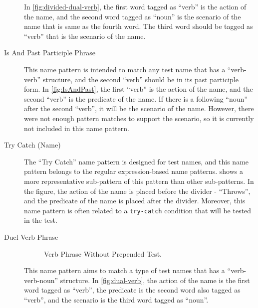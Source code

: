 \documentclass[proposal.tex]{subfiles}
\begin{document}
\begin{description}
In \cref{fig:divided-dual-verb}, the first word tagged as \enquote{verb} is the action of the name, and the second word tagged as \enquote{noun} is the scenario of the name that is same as the fourth word.
%
The third word should be tagged as \enquote{verb} that is the scenario of the name.

\item[Is And Past Participle Phrase]


This name pattern is intended to match any test name that has a \enquote{verb-verb} structure, and the second \enquote{verb} should be in its past participle form.
%
In \cref{fig:IsAndPast}, the first \enquote{verb} is the action of the name, and the second \enquote{verb} is the predicate of the name.
%
If there is a following \enquote{noun} after the second \enquote{verb}, it will be the scenario of the name.
%
However, there were not enough pattern matches to support the scenario, so it is currently not included in this name pattern. 


\item[Try Catch (Name)]

The \enquote{Try Catch} name pattern is designed for test names, and this name pattern belongs to the regular expression-based name patterns.
%
 shows a more representative sub-pattern of this pattern than other sub-patterns.
%
In the figure, the action of the name is placed before the divider - \enquote{Throws}, and the predicate of the name is placed after the divider.
%
Moreover, this name pattern is often related to a \texttt{try-catch} condition that will be tested in the test.

\item[Duel Verb Phrase]

\begin{figure}[t]
\centering
    \begin{subfigure}{0.65\textwidth}
    \end{subfigure}
\caption{Verb Phrase Without Prepended Test.}
\label{fig:verb-without-test}
\end{figure}

This name pattern aims to match a type of test names that has a \enquote{verb-verb-noun} structure.
%
In \cref{fig:dual-verb}, the action of the name is the first word tagged as \enquote{verb}, the predicate is the second word also tagged as \enquote{verb}, and the scenario is the third word tagged as \enquote{noun}.


\end{description}
\end{document}
